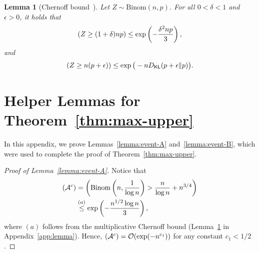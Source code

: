 \documentclass[journal, onecolumn]{IEEEtran}
\theoremstyle{plain}
\newtheorem{lemma}[theorem]{Lemma}
\theoremstyle{definition}
\theoremstyle{remark}
\def\ca{{\mathcal A}}
\def\co{{\mathcal O}}
\let\P\relax
\DeclareMathOperator\P{\mathsf{P}}
\begin{document}
\begin{lemma}[Chernoff bound~\citep{mitzenmacher_upfal_2005}] \label{lemma:chernoff}
    Let $Z\sim \mathrm{Binom}(n,p)$. For all $0 < \delta < 1$ and $\epsilon > 0$, it holds that
    \begin{equation*}
        \P\left(Z\ge (1+\delta)np\right)\le \exp\left(-\frac{\delta^2np}{3}\right),
    \end{equation*}
    and
    \[
        \P\left(Z\ge n(p+\epsilon)\right)\le \exp\big( -nD_{\mathsf{KL}}(p+\epsilon \| p)\big).
    \]
\end{lemma}




\section{Helper Lemmas for Theorem~\ref{thm:max-upper}} \label{app:helper-max-upper}
In this appendix, we prove Lemmas~\ref{lemma:event-A} and~\ref{lemma:event-B}, which were used to complete the proof of Theorem~\ref{thm:max-upper}.

\begin{proof}[Proof of Lemma~\ref{lemma:event-A}]
    Notice that
    \begin{align*}
        \P(\ca^c)&=\P\left(\mathrm{Binom}\left(n,\frac{1}{\log n}\right)> \frac{n}{\log n}+n^{3/4}\right)\\
        &\stackrel{(a)}{\le} \exp\left(-\frac{n^{1/2}\log n}{3}\right),
    \end{align*}
    where $(a)$ follows from the multiplicative Chernoff bound (Lemma~\ref{lemma:chernoff} in Appendix~\ref{app:lemma}). Hence, $\P(\ca^c) = \co(\exp(-n^{c_1}))$ for any constant $c_1 < 1/2$.
\end{proof}
\end{document}
